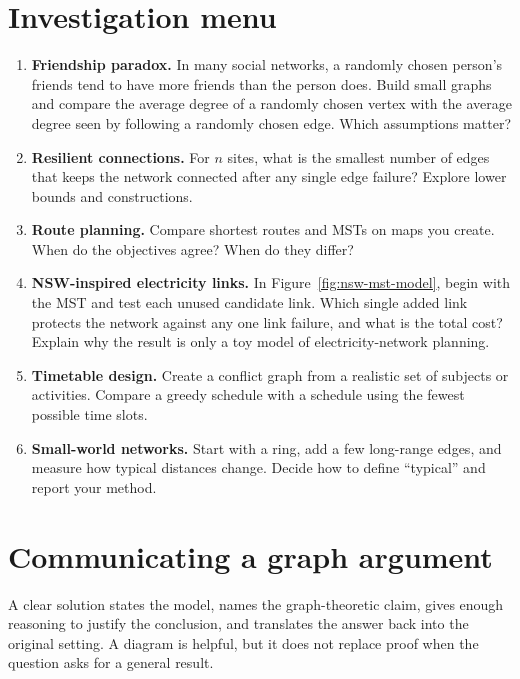 \section*{Investigation menu}
\begin{enumerate}
\item \Investigation{} \textbf{Friendship paradox.} In many social networks, a randomly chosen person's friends tend to have more friends than the person does. Build small graphs and compare the average degree of a randomly chosen vertex with the average degree seen by following a randomly chosen edge. Which assumptions matter?
\item \Investigation{} \textbf{Resilient connections.} For $n$ sites, what is the smallest number of edges that keeps the network connected after any single edge failure? Explore lower bounds and constructions.
\item \Investigation{} \textbf{Route planning.} Compare shortest routes and MSTs on maps you create. When do the objectives agree? When do they differ?
\item \Investigation{} \textbf{NSW-inspired electricity links.} In Figure~\ref{fig:nsw-mst-model}, begin with the MST and test each unused candidate link. Which single added link protects the network against any one link failure, and what is the total cost? Explain why the result is only a toy model of electricity-network planning.
\item \Investigation{} \textbf{Timetable design.} Create a conflict graph from a realistic set of subjects or activities. Compare a greedy schedule with a schedule using the fewest possible time slots.
\item \Investigation{} \textbf{Small-world networks.} Start with a ring, add a few long-range edges, and measure how typical distances change. Decide how to define ``typical'' and report your method.
\end{enumerate}

\section*{Communicating a graph argument}
A clear solution states the model, names the graph-theoretic claim, gives enough reasoning to justify the conclusion, and translates the answer back into the original setting. A diagram is helpful, but it does not replace proof when the question asks for a general result.
